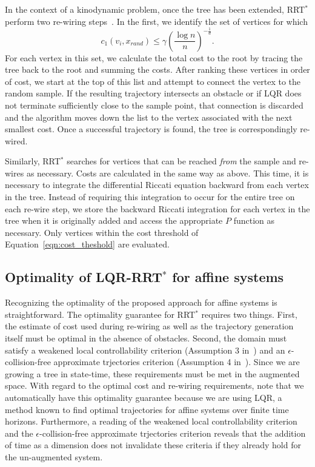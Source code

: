 \documentclass[letterpaper, 10pt, english, conference]{IEEEtran}
\begin{document}
In the context of a kinodynamic problem, once the tree has been
extended, RRT$^*$ perform two re-wiring steps~\cite{karaman_cdc10}. In
the first, we identify the set of vertices for which
\begin{equation}
c_1(v_i,x_{rand}) \leq \gamma \left( \frac{\log n}{n} \right)^{-\frac{1}{d}}.
\label{eqn:cost_theshold}
\end{equation}
For each vertex in this set, we calculate the total cost to the root
by tracing the tree back to the root and summing the costs. After
ranking these vertices in order of cost, we start at the top of this
list and attempt to connect the vertex to the random sample. If the
resulting trajectory intersects an obstacle or if LQR does not
terminate sufficiently close to the sample point, that connection is
discarded and the algorithm moves down the list to the vertex
associated with the next smallest cost. Once a successful trajectory
is found, the tree is correspondingly re-wired.

Similarly, RRT$^*$ searches for vertices that can be reached {\em
  from} the sample and re-wires as necessary. Costs are calculated in
the same way as above. This time, it is necessary to integrate the
differential Riccati equation backward from each vertex in the
tree. Instead of requiring this integration to occur for the entire
tree on each re-wire step, we store the backward Riccati integration
for each vertex in the tree when it is originally added and access the
appropriate $P$ function as necessary. Only vertices within the cost
threshold of Equation~\ref{eqn:cost_theshold} are evaluated.


\subsection{Optimality of LQR-RRT$^*$ for affine systems}

Recognizing the optimality of the proposed approach for affine systems
is straightforward. The optimality guarantee for RRT$^*$ requires two
things. First, the estimate of cost used during re-wiring as well as
the trajectory generation itself must be optimal in the absence of
obstacles. Second, the domain must satisfy a weakened local
controllability criterion (Assumption 3 in~\cite{karaman_cdc10}) and
an $\epsilon$-collision-free approximate trjectories criterion
(Assumption 4 in~\cite{karaman_cdc10}). Since we are growing a tree in
state-time, these requirements must be met in the augmented
space. With regard to the optimal cost and re-wiring requirements,
note that we automatically have this optimality guarantee because we
are using LQR, a method known to find optimal trajectories for affine
systems over finite time horizons. Furthermore, a reading of the
weakened local controllability criterion and the
$\epsilon$-collision-free approximate trjectories criterion reveals
that the addition of time as a dimension does not invalidate these
criteria if they already hold for the un-augmented system.
\end{document}
